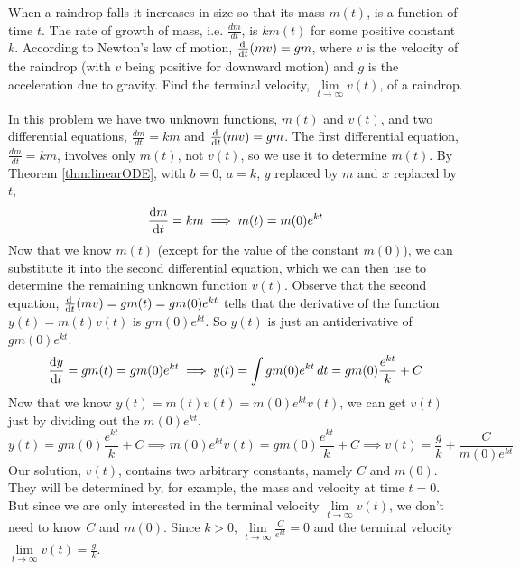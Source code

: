 \begin{eg}\label{eg:SDEraindrop}
When a raindrop falls it increases
in size so that its mass $m(t)$, is a function of time $t$. The rate of
growth of mass, i.e. $\frac{dm}{dt}$, is $km(t)$ for some positive
constant $k$. According to Newton's law of motion, $\diff{}{t} (mv)=gm$,
where $v$ is the velocity of the raindrop (with $v$ being positive for
downward motion) and $g$ is the acceleration due to gravity. Find the
terminal velocity, $\lim\limits_{t\rightarrow\infty}v(t)$, of a raindrop.

\soln In this problem we have two unknown functions, $m(t)$ and $v(t)$,
and two differential equations, $\frac{dm}{dt}=km$ and $\diff{}{t} (mv)=gm$.
The first differential equation, $\frac{dm}{dt}=km$, involves only
$m(t)$, not $v(t)$, so we use it to determine $m(t)$.
By Theorem \ref{thm:linearODE}, with $b=0$, $a=k$, $y$ replaced
by $m$ and $x$ replaced by $t$,
\begin{equation*}
\diff{m}{t}=km
\implies m(t) = m(0) e^{kt}
\end{equation*}
Now that we know $m(t)$ (except for the value of the constant $m(0)$),
we can substitute it into the second differential
equation, which we can then use to determine the remaining unknown function
$v(t)$. Observe that the second equation, $\diff{}{t} (mv)=gm(t)=gm(0)e^{kt}$
tells that the derivative of the function $y(t)=m(t)v(t)$ is
$gm(0)e^{kt}$. So $y(t)$ is just an antiderivative of $gm(0)e^{kt}$.
\begin{equation*}
\diff{y}{t}=gm(t)=gm(0)e^{kt}
\implies y(t)=\int gm(0)e^{kt}\,dt = gm(0)\frac{e^{kt}}{k}+C
\end{equation*}
Now that we know $y(t)=m(t)v(t)=m(0)e^{kt}v(t)$, we can get $v(t)$ just by
dividing out the $m(0)e^{kt}$.
\begin{equation*}
y(t)=gm(0)\frac{e^{kt}}{k}+C\implies m(0)e^{kt}v(t)=gm(0)\frac{e^{kt}}{k}+C
\implies v(t)=\frac{g}{k}+\frac{C}{m(0)e^{kt}}
\end{equation*}
Our solution, $v(t)$, contains two arbitrary constants, namely $C$ and $m(0)$.
They will be determined by, for example, the mass and velocity at time $t=0$.
But since we are only interested in the terminal velocity
$\lim\limits_{t\rightarrow\infty}v(t)$, we don't need to know $C$ and $m(0)$.
Since $k>0$, $\lim\limits_{t\rightarrow\infty}\frac{C}{e^{kt}}=0$ and
the terminal velocity
$\lim\limits_{t\rightarrow\infty}v(t)=\frac{g}{k}$.

\end{eg}


